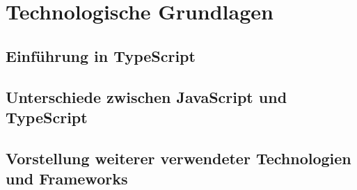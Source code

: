 \section{Technologische Grundlagen}
\subsection[Einführung in TypeScript]{Einführung in TypeScript}

\subsection[Unterschiede zwischen JavaScript und TypeScript]{Unterschiede zwischen JavaScript und TypeScript}

\subsection[Vorstellung weiterer verwendeter Technologien und Frameworks]{Vorstellung weiterer verwendeter Technologien und Frameworks}